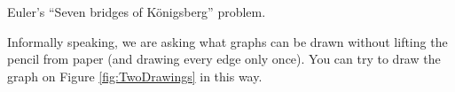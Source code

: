 

\setcounter{section}{1}
\setcounter{subsection}{6}
\setcounter{dfn}{18}

Euler's ``Seven bridges of K\"onigsberg'' problem.

Informally speaking, we are asking what graphs can be drawn without lifting the pencil from paper
(and drawing every edge only once).
You can try to draw the graph on Figure \ref{fig:TwoDrawings} in this way.



